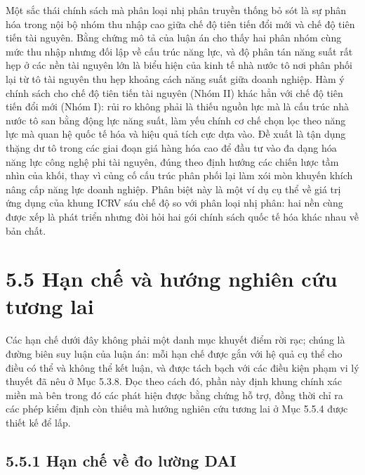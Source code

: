 \documentclass[
  a4paper,
  13pt]{extreport}
\begin{document}
Một sắc thái chính sách mà phân loại nhị phân truyền thống bỏ sót là sự
phân hóa trong nội bộ nhóm thu nhập cao giữa chế độ tiên tiến đổi mới và
chế độ tiên tiến tài nguyên. Bằng chứng mô tả của luận án cho thấy hai
phân nhóm cùng mức thu nhập nhưng đối lập về cấu trúc năng lực, và độ
phân tán năng suất rất hẹp ở các nền tài nguyên lớn là biểu hiện của
kinh tế nhà nước tô nơi phân phối lại từ tô tài nguyên thu hẹp khoảng
cách năng suất giữa doanh nghiệp. Hàm ý chính sách cho chế độ tiên tiến
tài nguyên (Nhóm II) khác hẳn với chế độ tiên tiến đổi mới (Nhóm I): rủi
ro không phải là thiếu nguồn lực mà là cấu trúc nhà nước tô san bằng
động lực năng suất, làm yếu chính cơ chế chọn lọc theo năng lực mà quan
hệ quốc tế hóa và hiệu quả tích cực dựa vào. Đề xuất là tận dụng thặng
dư tô trong các giai đoạn giá hàng hóa cao để đầu tư vào đa dạng hóa
năng lực công nghệ phi tài nguyên, đúng theo định hướng các chiến lược
tầm nhìn của khối, thay vì củng cố cấu trúc phân phối lại làm xói mòn
khuyến khích nâng cấp năng lực doanh nghiệp. Phân biệt này là một ví dụ
cụ thể về giá trị ứng dụng của khung ICRV sáu chế độ so với phân loại
nhị phân: hai nền cùng được xếp là phát triển nhưng đòi hỏi hai gói
chính sách quốc tế hóa khác nhau về bản chất.

\hypertarget{hux1ea1n-chux1ebf-vuxe0-hux1b0ux1edbng-nghiuxean-cux1ee9u-tux1b0ux1a1ng-lai}{%
\section{5.5 Hạn chế và hướng nghiên cứu tương
lai}\label{hux1ea1n-chux1ebf-vuxe0-hux1b0ux1edbng-nghiuxean-cux1ee9u-tux1b0ux1a1ng-lai}}

Các hạn chế dưới đây không phải một danh mục khuyết điểm rời rạc; chúng
là đường biên suy luận của luận án: mỗi hạn chế được gắn với hệ quả cụ
thể cho điều có thể và không thể kết luận, và được tách bạch với các
điều kiện phạm vi lý thuyết đã nêu ở Mục 5.3.8. Đọc theo cách đó, phần
này định khung chính xác miền mà bên trong đó các phát hiện được bằng
chứng hỗ trợ, đồng thời chỉ ra các phép kiểm định còn thiếu mà hướng
nghiên cứu tương lai ở Mục 5.5.4 được thiết kế để lấp.

\hypertarget{hux1ea1n-chux1ebf-vux1ec1-ux111o-lux1b0ux1eddng-dai}{%
\subsection{5.5.1 Hạn chế về đo lường
DAI}\label{hux1ea1n-chux1ebf-vux1ec1-ux111o-lux1b0ux1eddng-dai}}
\end{document}
